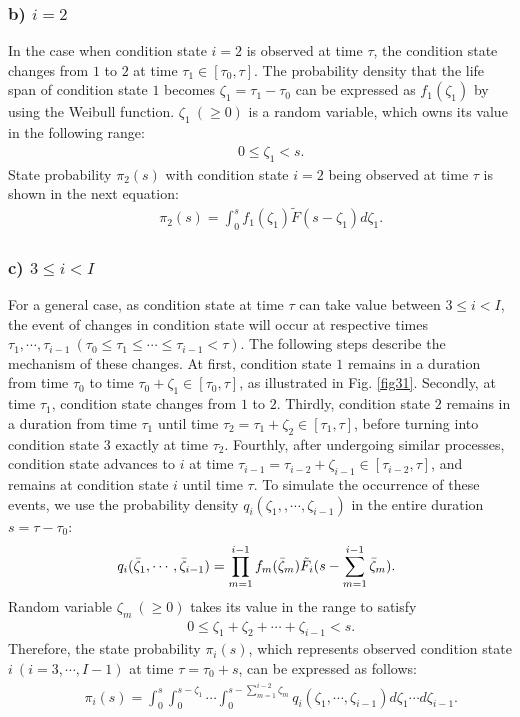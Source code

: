 \subsubsection{b) $i=2$ }
\label{3322}
In the case when condition state $i=2$ is observed at time $\tau$, the condition state changes from $1$ to $2$ at time $\tau_1 \in [\tau_0, \tau]$. The probability density that the life span of condition state $1$ becomes $\zeta_1=\tau_1-\tau_0$ can be expressed as $f_1(\zeta_1)$ by using the Weibull function. $\zeta_1~(\geq 0)$ is a random variable, which owns its value in the following range:
\begin{eqnarray}
&& 0\leq \zeta_1 < s. \label{hanni}
\end{eqnarray}
State probability $\pi_{2} (s)$ with condition state $i=2$ being observed at time $\tau$ is shown in the next equation: 
\begin{eqnarray}
&& \pi_{2}(s) =\int_{0}^{s} f_{1}(\zeta_1)\tilde{F}(s-\zeta_1)d\zeta_1. \label{i2}
\end{eqnarray}
\subsubsection{c) $3\leq i<I$}
\label{3323}
For a general case, as condition state at time $\tau$ can take value between $3\leq i<I$, the event of changes in condition state will occur at respective times $\tau_1,\cdots,\tau_{i-1}~(\tau_0\leq \tau_1 \leq \cdots \leq \tau_{i-1}< \tau)$. The following steps describe the mechanism of these changes. At first, condition state $1$  remains in a duration from time $\tau_0$ to time $\tau_0+\zeta_{1}\in [\tau_{0},\tau]$, as illustrated in Fig. \ref{fig31}. Secondly, at time $\tau_1$, condition state changes from $1$ to $2$. Thirdly, condition state $2$ remains in a duration from time $\tau_1$ until time $\tau_2=\tau_{1}+\zeta_{2}\in [\tau_1,\tau]$, before turning into condition state $3$ exactly at time $\tau_2$. Fourthly, after undergoing similar processes, condition state advances to $i$ at time $\tau_{i-1}=\tau_{i-2}+\zeta_{i-1}\in [\tau_{i-2},\tau]$, and remains at condition state $i$ until time $\tau$. To simulate the occurrence of these events, we use the probability density $q_{i} (\zeta_1,,\cdots,\zeta_{i-1})$ in the entire duration $s=\tau-\tau_{0}$:
\begin{eqnarray}
&& \hspace{-5mm} q_{i}(\bar{\zeta}_1,\cdots,\bar{\zeta}_{i-1})
 = \prod_{m=1}^{i-1} f_{m}(\bar{\zeta}_m) \tilde{F}_{i}(s-\sum_{m=1}^{i-1}\bar{\zeta}_m).
\end{eqnarray}
Random variable $\zeta_m~(\geq 0)$ takes its value in the range to satisfy
\begin{eqnarray}
&& 0\leq \zeta_1+\zeta_{2}+\cdots+\zeta_{i-1} < s. \label{hani}
\end{eqnarray}
Therefore, the state probability  $\pi_{i} (s)$, which represents observed condition state $i~(i=3,\cdots,I-1)$ at time $\tau=\tau_0+s$, can be expressed as follows:
\begin{eqnarray}
&& \pi_{i}(s)=\int_{0}^{s}\int_0^{s-\zeta_{1}} \cdots
\int_{0}^{s-\sum_{m=1}^{i-2}\zeta_{m}}
 q_{i}(\zeta_1,\cdots,\zeta_{i-1}) d\zeta_1\cdots d\zeta_{i-1}. \label{dousyutu1}
\end{eqnarray}
